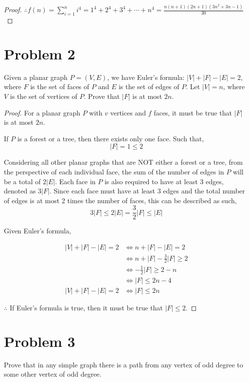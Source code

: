 \documentclass[11pt]{article}
\begin{document}
\begin{proof}
\noindent $\therefore f(n) = \sum_{i=1}^{n}{i^4} = 1^{4} + 2^{4} +3^{4} + \cdots + n^{4} = \frac{n(n+1)(2n+1)(3n^{2}+3n-1)}{30}$

\end{proof}


\section*{Problem 2}
Given a planar graph $P=(V,E)$, we have Euler's formula: $|V|+|F|-|E|=2$, where $F$ is the set of faces of $P$ and $E$ is the set of edges of $P$. Let $|V|=n$, where $V$ is the set of vertices of $P$. Prove that $|F|$ is at most $2n$.
\begin{proof}
For a planar graph $P$ with $v$ vertices and $f$ faces, it must be true that $|F|$ is at most $2n$.
\newline

\noindent
If $P$ is a forest or a tree, then there exists only one face. Such that, \[|F| = 1 \le 2\]

\noindent
Considering all other planar graphs that are NOT either a forest or a tree, from the perspective of each individual face, the sum of the number of edges in $P$ will be a total of $2|E|$. Each face in $P$ is also required to have at least 3 edges, denoted as $3|F|$. Since each face must have at least 3 edges and the total number of edges is at most 2 times the number of faces, this can be described as such,
\[3|F| \le  2|E| = \frac{3}{2} |F| \le |E|\]

\noindent
Given Euler's formula,

\begin{align*}
    |V| + |F| - |E| = 2 & \iff n + |F| - |E| = 2 \\
    & \iff n + |F| - \frac{3}{2}|F| \geq 2 \\
    & \iff - \frac{1}{2}|F| \geq 2 - n \\
    & \iff |F| \le 2n - 4 \\
    |V| + |F| - |E| = 2 & \iff |F| \le 2n
\end{align*}

\noindent
$\therefore$ If Euler's formula is true, then it must be true that $|F| \le 2$.

\end{proof}

\newpage
\section*{Problem 3}
Prove that in any simple graph there is a path from any vertex of odd degree to some other vertex of odd degree.
\end{document}
